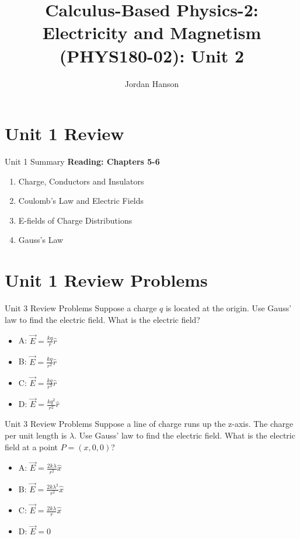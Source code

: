 \documentclass{beamer}
\title{Calculus-Based Physics-2: Electricity and Magnetism (PHYS180-02): Unit 2}
\author{Jordan Hanson}
\institute{Whittier College Department of Physics and Astronomy}
\begin{document}
\maketitle

\section{Unit 1 Review}

\begin{frame}{Unit 1 Summary}
\textbf{Reading: Chapters 5-6}
\begin{enumerate}
\item Charge, Conductors and Insulators
\item Coulomb's Law and Electric Fields
\item E-fields of Charge Distributions
\item Gauss's Law
\end{enumerate}
\end{frame}

\section{Unit 1 Review Problems}

\begin{frame}{Unit 3 Review Problems}
Suppose a charge $q$ is located at the origin.  Use Gauss' law to find the electric field.  What is the electric field?
\begin{itemize}
\item A: $\vec{E} = \frac{kq}{r}\hat{r}$
\item B: $\vec{E} = \frac{kq}{r^2}\hat{r}$
\item C: $\vec{E} = \frac{kq}{r^3}\hat{r}$
\item D: $\vec{E} = \frac{kq^2}{r^2}\hat{r}$
\end{itemize}
\end{frame}

\begin{frame}{Unit 3 Review Problems}
Suppose a line of charge runs up the z-axis.  The charge per unit length is $\lambda$.  Use Gauss' law to find the electric field.  What is the electric field at a point $P = (x,0,0)$?
\begin{itemize}
\item A: $\vec{E} = \frac{2k\lambda}{r^2} \hat{x}$
\item B: $\vec{E} = \frac{2k\lambda^2}{r^2} \hat{x}$
\item C: $\vec{E} = \frac{2k\lambda}{r} \hat{x}$
\item D: $\vec{E} = 0$
\end{itemize}
\end{frame}
\end{document}
